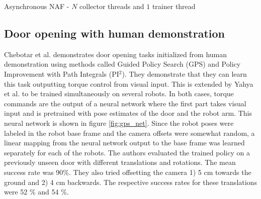 \begin{algorithm}[!h]
    \caption{Asynchronous NAF - $N$ collector threads and $1$ trainer thread}
    \begin{algorithmic}
        \ENDFOR
            \ENDFOR
        \ENDFOR
    \end{algorithmic}
    \label{algo:async_naf}
\end{algorithm}

\subsection{Door opening with human demonstration}

Chebotar et al. \cite{chebotar2016path} demonstrates door opening tasks
initialized from human demonstration using methods called Guided Policy Search
(GPS) and Policy Improvement with Path Integrals (PI$^2$). They demonstrate
that they can learn this task outputting torque control from visual input. This is
extended by Yahya et al. \cite{yahya2016collective} to be trained
simultaneously on several robots. In both cases, torque commands are the output
of a neural network where the first part takes visual input and is pretrained
with pose estimates of the door and the robot arm. This neural network is shown
in figure \ref{fig:gps_net}. Since the robot poses were labeled in the robot
base frame and the camera offsets were somewhat random, a linear mapping from
the neural network output to the base frame was learned separately for each of
the robots. The authors evaluated the trained policy on a previously unseen
door with different translations and rotations. The mean success rate was
90\%. They also tried offsetting the camera 1) 5 cm towards the ground and 2) 4
cm backwards. The respective success rates for these translations were 52 \%
and 54 \%.

